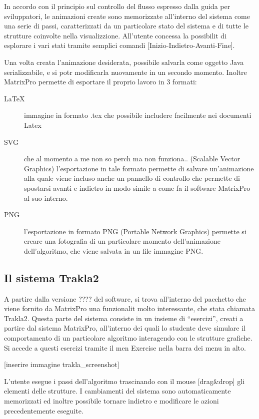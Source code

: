 In accordo con il principio sul controllo del flusso espresso dalla
guida per sviluppatori, le animazioni create sono memorizzate all'interno
del sistema come una serie di passi, caratterizzati da un particolare
stato del sistema e di tutte le strutture coinvolte nella visualizzione.
All'utente  concessa la possibilit di esplorare i vari stati tramite
semplici comandi {[}Inizio-Indietro-Avanti-Fine{]}.

Una volta creata l'animazione desiderata,  possibile salvarla come
oggetto Java serializzabile, e si potr modificarla nuovamente in
un secondo momento. Inoltre MatrixPro permette di esportare il proprio
lavoro in 3 formati:
\begin{description}
\item [{\LaTeX{}}] \foreignlanguage{english}{immagine
in formato .tex che  possibile includere facilmente nei documenti
Latex }
%
\item [{SVG}] che al momento a me non so perch ma non funziona.. (Scalable
Vector Graphics) l'esportazione in tale formato permette di salvare
un'animazione alla quale viene incluso anche un pannello di controllo
che permette di spostarsi avanti e indietro in modo simile a come
fa il software MatrixPro al suo interno.
\item [{PNG}] l'esportazione in formato PNG (Portable Network Graphics)
permette si creare una fotografia di un particolare momento dell'animazione
dell'algoritmo, che viene salvata in un file immagine PNG.
\end{description}
%

\subsection{Il sistema Trakla2}

A partire dalla versione ???? del software, si trova all'interno del
pacchetto che viene fornito da MatrixPro una funzionalit molto interessante,
che  stata chiamata Trakla2. Questa parte del sistema consiste in
un insieme di {}``esercizi'', creati a partire dal sistema MatrixPro,
all'interno dei quali lo studente deve simulare il comportamento di
un particolare algoritmo interagendo con le strutture grafiche. Si
accede a questi esercizi tramite il men Exercise nella barra dei
menu in alto.

{[}inserire immagine trakla\_screenshot{]}

L'utente esegue i passi dell'algoritmo trascinando con il mouse {[}drag\&drop{]}
gli elementi delle strutture. I cambiamenti del sistema sono automaticamente
memorizzati ed  inoltre possibile tornare indietro e modificare le
azioni precedentemente eseguite.

